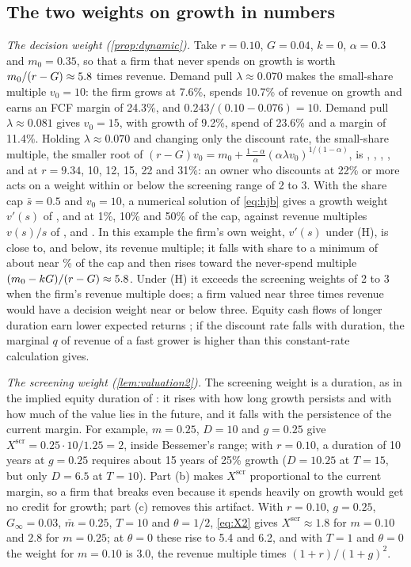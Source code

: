 \subsection{The two weights on growth in numbers}\label{supp:model-weights}
\emph{The decision weight (\autoref{prop:dynamic}).} Take $r=0.10$, $G=0.04$, $k=0$, $\alpha=0.3$ and $m_0=0.35$, so that a firm that never spends on growth is worth $m_0/(r-G)\approx5.8$ times revenue. Demand pull $\lambda\approx 0.070$ makes the small-share multiple $v_0=10$: the firm grows at 7.6\%, spends 10.7\% of revenue on growth and earns an FCF margin of 24.3\%, and $0.243/(0.10-0.076)=10$. Demand pull $\lambda\approx 0.081$ gives $v_0=15$, with growth of 9.2\%, spend of 23.6\% and a margin of 11.4\%. Holding $\lambda\approx0.070$ and changing only the discount rate, the small-share multiple, the smaller root of $(r-G)v_0=m_0+\frac{1-\alpha}{\alpha}(\alpha\lambda v_0)^{1/(1-\alpha)}$, is \WeightWacc, \WeightTen, \WeightTwelve, \WeightFifteen, \WeightTwentyTwo{} and \WeightThirtyOne{} at $r=9.34$, 10, 12, 15, 22 and 31\%: an owner who discounts at 22\% or more acts on a weight within or below the screening range of 2 to 3. With the share cap $\bar s=0.5$ and $v_0=10$, a numerical solution of \eqref{eq:hjb} gives a growth weight $v'(s)$ of \VpOnePct, \VpTenPct{} and \VpFiftyPct{} at 1\%, 10\% and 50\% of the cap, against revenue multiples $v(s)/s$ of \VsOnePct, \VsTenPct{} and \VsFiftyPct. In this example the firm's own weight, $v'(s)$ under (H), is close to, and below, its revenue multiple; it falls with share to a minimum of about \VpMin{} near \VpMinAt\% of the cap and then rises toward the never-spend multiple $(m_0-kG)/(r-G)\approx5.8$. Under (H) it exceeds the screening weights of 2 to 3 when the firm's revenue multiple does; a firm valued near three times revenue would have a decision weight near or below three. Equity cash flows of longer duration earn lower expected returns \citep{weber2018cash,gormsen2023duration}; if the discount rate falls with duration, the marginal $q$ of revenue of a fast grower is higher than this constant-rate calculation gives.

\emph{The screening weight (\autoref{lem:valuation2}).} The screening weight is a duration, as in the implied equity duration of \citet{dechow2004implied}: it rises with how long growth persists and with how much of the value lies in the future, and it falls with the persistence of the current margin. For example, $m=0.25$, $D=10$ and $g=0.25$ give $X^{\mathrm{scr}}=0.25\cdot 10/1.25=2$, inside Bessemer's range; with $r=0.10$, a duration of 10 years at $g=0.25$ requires about 15 years of 25\% growth ($D=10.25$ at $T=15$, but only $D=6.5$ at $T=10$). Part (b) makes $X^{\mathrm{scr}}$ proportional to the current margin, so a firm that breaks even because it spends heavily on growth would get no credit for growth; part (c) removes this artifact. With $r=0.10$, $g=0.25$, $G_\infty=0.03$, $\bar m=0.25$, $T=10$ and $\theta=1/2$, \eqref{eq:X2} gives $X^{\mathrm{scr}}\approx 1.8$ for $m=0.10$ and $2.8$ for $m=0.25$; at $\theta=0$ these rise to 5.4 and 6.2, and with $T=1$ and $\theta=0$ the weight for $m=0.10$ is 3.0, the revenue multiple times $(1+r)/(1+g)^2$.

